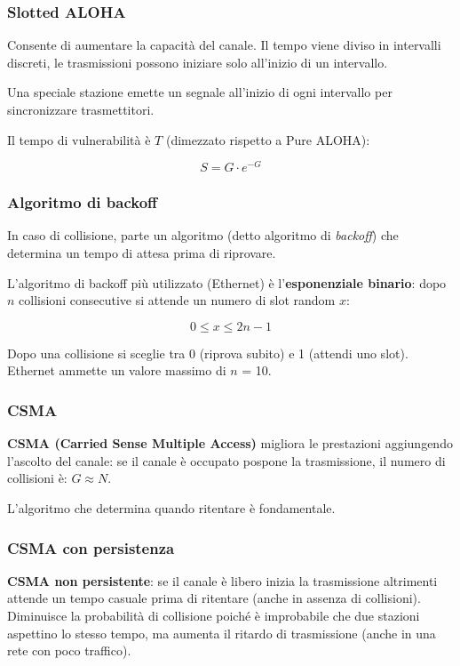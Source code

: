         \subsubsection{Slotted ALOHA}
            Consente di aumentare la capacità del canale. Il tempo viene diviso in intervalli discreti, le trasmissioni possono iniziare solo all'inizio di un intervallo.

            Una speciale stazione emette un segnale all'inizio di ogni intervallo per sincronizzare trasmettitori.

            Il tempo di vulnerabilità è $T$ (dimezzato rispetto a Pure ALOHA):

            \begin{equation*}
                S = G \cdot e^{-G}
            \end{equation*}

        \subsubsection{Algoritmo di backoff}
            In caso di collisione, parte un algoritmo (detto algoritmo di \textit{backoff}) che determina un tempo di attesa prima di riprovare.

            L'algoritmo di backoff più utilizzato (Ethernet) è l'\textbf{esponenziale binario}: dopo $n$ collisioni consecutive si attende un numero di slot random $x$:

            \begin{equation*}
                0 \leq x \leq 2n - 1
            \end{equation*}

            Dopo una collisione si sceglie tra 0 (riprova subito) e 1 (attendi uno slot). Ethernet ammette un valore massimo di $n$ = 10.

        \subsubsection{CSMA}
            \textbf{CSMA (Carried Sense Multiple Access)} migliora le prestazioni aggiungendo l'ascolto del canale: se il canale è occupato pospone la trasmissione, il numero di collisioni è: $G \approx N$.
        
            L'algoritmo che determina quando ritentare è fondamentale.

        \subsubsection{CSMA con persistenza}
            \textbf{CSMA non persistente}: se il canale è libero inizia la trasmissione altrimenti attende un tempo casuale prima di ritentare (anche in assenza di collisioni). Diminuisce la probabilità di collisione poiché è improbabile che due stazioni aspettino lo stesso tempo, ma aumenta il ritardo di trasmissione (anche in una rete con poco traffico).

